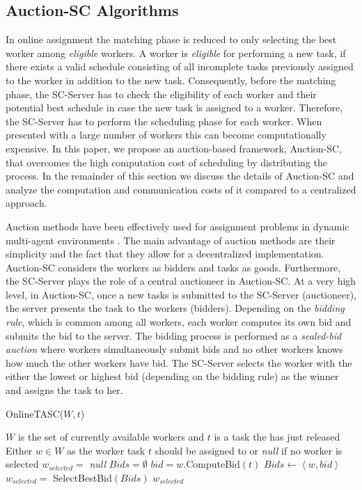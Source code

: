 \subsection{Auction-SC Algorithms}
In online assignment the matching phase is reduced to only selecting the best worker among \textit{eligible} workers. A worker is \textit{eligible} for performing a new task, if there exists a valid schedule consisting of all incomplete tasks previously assigned to the worker in addition to the new task. Consequently, before the matching phase, the SC-Server has to check the eligibility of each worker and their potential best schedule in case the new task is assigned to a worker. Therefore, the SC-Server has to perform the scheduling phase for each worker. When presented with a large number of workers this can become computationally expensive. In this paper, we propose an auction-based framework, Auction-SC, that overcomes the high computation cost of scheduling by distributing the process. In the remainder of this section we discuss the details of Auction-SC and analyze the computation and communication costs of it compared to a centralized approach.

Auction methods have been effectively used for assignment problems in dynamic multi-agent environments \cite{Mehta05,Lagoudakis04}. The main advantage of auction methods are their simplicity and the fact that they allow for a decentralized implementation.
Auction-SC considers the workers as bidders and tasks as goods. Furthermore, the SC-Server plays the role of a central auctioneer in Auction-SC. At a very high level, in Auction-SC, once a new tasks is submitted to the SC-Server (auctioneer), the server presents the task to the workers (bidders). Depending on the \textit{bidding rule}, which is common among all workers, each worker computes its own bid and submits the bid to the server. The bidding process is performed as a \textit{sealed-bid auction} where workers simultaneously submit bids and no other workers knows how much the other workers have bid. The SC-Server selects the worker with the either the lowest or highest bid (depending on the bidding rule) as the winner and assigns the task to her.


\begin{algorithm}
\caption{OnlineTASC($W, t$)}
\label{algo:OnlineTASC}
\begin{algorithmic}[1]
\REQUIRE $W$ is the set of currently available workers and $t$ is a task the has just released
\ENSURE Either $w \in W$ as the worker task $t$ should be assigned to or \emph{null} if no worker is selected
\STATE $w_{selected} = $ \emph{null}
\STATE $Bids = \emptyset$
	\STATE $bid = w$.ComputeBid$(t)$
	\STATE $Bids \leftarrow \left\langle w, bid \right\rangle$
\ENDFOR
\STATE $w_{selected} = $ SelectBestBid$(Bids)$
\RETURN $w_{selected}$
\end{algorithmic}
\end{algorithm}


